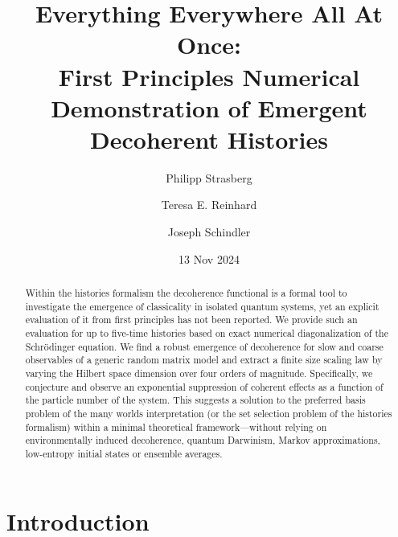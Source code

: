 \documentclass[pre,onecolumn,12pt,aps,longbibliography,nofootinbib]{revtex4-2}
\newcommand{\blue}[1]{#1}
\begin{document}
\title{Everything Everywhere All At Once: \\\blue{First Principles Numerical Demonstration of Emergent Decoherent Histories}}

\author{Philipp Strasberg}
\author{Teresa E. Reinhard}
\author{Joseph Schindler}


\date{13 Nov 2024}

\begin{abstract}
 Within the histories formalism the decoherence functional is a formal tool to investigate the emergence of classicality in isolated quantum systems, yet an explicit evaluation of it from first principles has not been reported. We provide such an evaluation for up to five-time histories based on exact numerical diagonalization of the Schr\"odinger equation. We find a robust emergence of decoherence for slow and coarse observables of a generic random matrix model and extract a finite size scaling law by varying the Hilbert space dimension over four orders of magnitude. Specifically, we conjecture and observe an exponential suppression of coherent effects as a function of the particle number of the system. This suggests a solution to the preferred basis problem of the many worlds interpretation (or the set selection problem of the histories formalism) within a minimal theoretical framework---without relying on environmentally induced decoherence, quantum Darwinism, Markov approximations, low-entropy initial states or ensemble averages.
\end{abstract}

\maketitle

\newtheorem{lemma}{Lemma}[section]

\newpage
\section{Introduction}
\label{sec intro}
\end{document}
